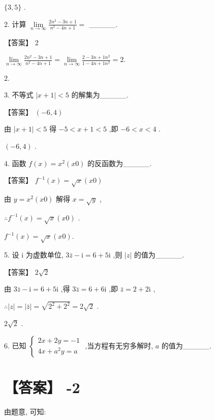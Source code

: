 \documentclass[10pt]{article}
\begin{document}
\(\{ 3,5\}\) .

2. 计算 \(\mathop{\lim }\limits_{{n \rightarrow  \infty }}\frac{2{n}^{2} - {3n} + 1}{{n}^{2} - {4n} + 1} =\) \_\_\_\_\_.

【答案】 2

\(\mathop{\lim }\limits_{{n \rightarrow  \infty }}\frac{2{n}^{2} - {3n} + 1}{{n}^{2} - {4n} + 1} = \mathop{\lim }\limits_{{n \rightarrow  \infty }}\frac{2 - {3n} + 1{n}^{2}}{1 - {4n} + 1{n}^{2}} = 2.\)

2.

3. 不等式 \(\left| {x + 1}\right|  < 5\) 的解集为\_\_\_\_\_.

【答案】 \(\left( {-6,4}\right)\)

由 \(\left| {x + 1}\right|  < 5\) 得 \(- 5 < x + 1 < 5\) ,即 \(- 6 < x < 4\) .

\(\left( {-6,4}\right)\) .

4. 函数 \(f\left( x\right)  = {x}^{2}\left( {x0}\right)\) 的反函数为\_\_\_\_\_.

【答案】 \({f}^{-1}\left( x\right)  = \sqrt{x}\left( {x0}\right)\)

由 \(y = {x}^{2}\left( {x0}\right)\) 解得 \(x = \sqrt{y}\) ,

\(\therefore {f}^{-1}\left( x\right)  = \sqrt{x}\left( {x0}\right)\) .

\({f}^{-1}\left( x\right)  = \sqrt{x}\left( {x0}\right) .\)

5. 设 \(\mathrm{i}\) 为虚数单位, \(3\bar{z} - \mathrm{i} = 6 + 5\mathrm{i}\) ,则 \(\left| z\right|\) 的值为\_\_\_\_\_.

【答案】 \(2\sqrt{2}\)

由 \(3\bar{z} - \mathrm{i} = 6 + 5\mathrm{i}\) ,得 \(3\bar{z} = 6 + 6\mathrm{i}\) ,即 \(\bar{z} = 2 + 2\mathrm{i}\) ,

\(\therefore \left| z\right|  = \left| \bar{z}\right|  = \sqrt{{2}^{2} + {2}^{2}} = 2\sqrt{2}\) .

\(2\sqrt{2}\) .

6. 已知 \(\left\{  \begin{array}{l} {2x} + {2y} =  - 1 \\  {4x} + {a}^{2}y = a \end{array}\right.\) ,当方程有无穷多解时, \(a\) 的值为\_\_\_\_\_.

\section*{【答案】 -2}

由题意, 可知:
\end{document}
